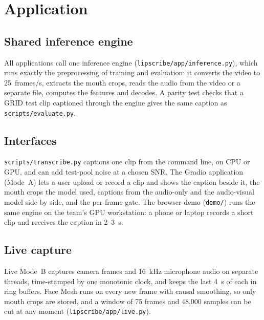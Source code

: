 \section{Application}
\label{sec:application}

\subsection{Shared inference engine}
All applications call one inference engine (\texttt{lipscribe/\allowbreak{}app/\allowbreak{}inference.py}), which runs
exactly the preprocessing of training and evaluation: it converts the video to 25~frames/s,
extracts the mouth crops, reads the audio from the video or a separate file, computes the
features and decodes. A parity test checks that a GRID test clip captioned through the engine
gives the same caption as \texttt{scripts/\allowbreak{}evaluate.py}.

\subsection{Interfaces}
\texttt{scripts/\allowbreak{}transcribe.py} captions one clip from the command line, on CPU or GPU, and can
add test-pool noise at a chosen SNR. The Gradio application (Mode~A) lets a user upload or
record a clip and shows the caption beside it, the mouth crops the model used, captions from
the audio-only and the audio-visual model side by side, and the per-frame gate. The browser
demo (\texttt{demo/}) runs the same engine on the team's GPU workstation: a phone or laptop
records a short clip and receives the caption in 2--3~s.

\subsection{Live capture}
Live Mode~B captures camera frames and 16~kHz microphone audio on separate threads, time-stamped
by one monotonic clock, and keeps the last 4~s of each in ring buffers. Face Mesh runs on every
new frame with causal smoothing, so only mouth crops are stored, and a window of 75 frames and
48,000 samples can be cut at any moment (\texttt{lipscribe/\allowbreak{}app/\allowbreak{}live.py}).

